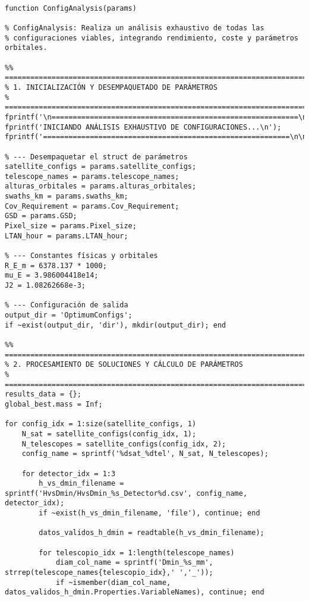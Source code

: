 \begin{verbatim}

function ConfigAnalysis(params)

% ConfigAnalysis: Realiza un análisis exhaustivo de todas las
% configuraciones viables, integrando rendimiento, coste y parámetros orbitales.

%% ========================================================================
% 1. INICIALIZACIÓN Y DESEMPAQUETADO DE PARÁMETROS
% ========================================================================
fprintf('\n==========================================================\n');
fprintf('INICIANDO ANÁLISIS EXHAUSTIVO DE CONFIGURACIONES...\n');
fprintf('==========================================================\n\n');

% --- Desempaquetar el struct de parámetros
satellite_configs = params.satellite_configs;
telescope_names = params.telescope_names;
alturas_orbitales = params.alturas_orbitales;
swaths_km = params.swaths_km;
Cov_Requirement = params.Cov_Requirement;
GSD = params.GSD;
Pixel_size = params.Pixel_size;
LTAN_hour = params.LTAN_hour;

% --- Constantes físicas y orbitales
R_E_m = 6378.137 * 1000;
mu_E = 3.986004418e14;
J2 = 1.08262668e-3;

% --- Configuración de salida
output_dir = 'OptimumConfigs';
if ~exist(output_dir, 'dir'), mkdir(output_dir); end

%% ========================================================================
% 2. PROCESAMIENTO DE SOLUCIONES Y CÁLCULO DE PARÁMETROS
% ========================================================================
results_data = {};
global_best.mass = Inf;

for config_idx = 1:size(satellite_configs, 1)
    N_sat = satellite_configs(config_idx, 1);
    N_telescopes = satellite_configs(config_idx, 2);
    config_name = sprintf('%dsat_%dtel', N_sat, N_telescopes);

    for detector_idx = 1:3
        h_vs_dmin_filename = sprintf('HvsDmin/HvsDmin_%s_Detector%d.csv', config_name, detector_idx);
        if ~exist(h_vs_dmin_filename, 'file'), continue; end
        
        datos_validos_h_dmin = readtable(h_vs_dmin_filename);
        
        for telescopio_idx = 1:length(telescope_names)
            diam_col_name = sprintf('Dmin_%s_mm', strrep(telescope_names{telescopio_idx},' ','_'));
            if ~ismember(diam_col_name, datos_validos_h_dmin.Properties.VariableNames), continue; end
            

\end{verbatim}
